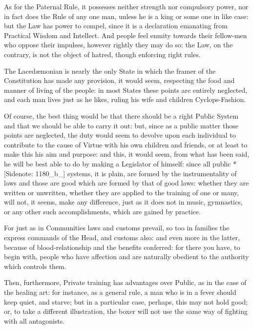 As for the Paternal Rule, it possesses neither strength nor compulsory
power, nor in fact does the Rule of any one man, unless he is a king or
some one in like case: but the Law has power to compel, since it is a
declaration emanating from Practical Wisdom and Intellect. And people
feel enmity towards their fellow-men who oppose their impulses, however
rightly they may do so: the Law, on the contrary, is not the object of
hatred, though enforcing right rules.

The Lacedæmonian is nearly the only State in which the framer of the
Constitution has made any provision, it would seem, respecting the food
and manner of living of the people: in most States these points are
entirely neglected, and each man lives just as he likes, ruling his wife
and children Cyclops-Fashion.

Of course, the best thing would be that there should be a right Public
System and that we should be able to carry it out: but, since as a
public matter those points are neglected, the duty would seem to devolve
upon each individual to contribute to the cause of Virtue with his own
children and friends, or at least to make this his aim and purpose: and
this, it would seem, from what has been said, he will be best able to do
by making a Legislator of himself: since all public *[Sidenote: 1180_b_]
systems, it is plain, are formed by the instrumentality of laws and
those are good which are formed by that of good laws: whether they are
written or unwritten, whether they are applied to the training of one or
many, will not, it seems, make any difference, just as it does not in
music, gymnastics, or any other such accomplishments, which are gained
by practice.

For just as in Communities laws and customs prevail, so too in families
the express commands of the Head, and customs also: and even more in the
latter, because of blood-relationship and the benefits conferred:
for there you have, to begin with, people who have affection and are
naturally obedient to the authority which controls them.

Then, furthermore, Private training has advantages over Public, as in
the case of the healing art: for instance, as a general rule, a man who
is in a fever should keep quiet, and starve; but in a particular case,
perhaps, this may not hold good; or, to take a different illustration,
the boxer will not use the same way of fighting with all antagonists.

